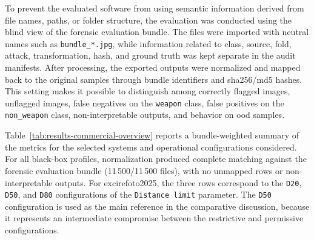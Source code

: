 To prevent the evaluated software from using semantic information derived from
file names, paths, or folder structure, the evaluation was conducted using the
blind view of the forensic evaluation bundle. The files were imported with
neutral names such as \texttt{bundle\_*.jpg}, while information related to
class, source, fold, attack, transformation, hash, and ground truth was kept
separate in the audit manifests. After processing, the exported outputs were
normalized and mapped back to the original samples through bundle identifiers
and \gls{sha256}/\gls{md5} hashes. This setting makes it possible to
distinguish among correctly flagged images, unflagged images, false negatives
on the \texttt{weapon} class, false positives on the \texttt{non\_weapon}
class, non-interpretable outputs, and behavior on \gls{ood} samples.

Table~\ref{tab:results-commercial-overview} reports a bundle-weighted summary
of the metrics for the selected systems and operational configurations
considered. For all black-box profiles, normalization produced complete
matching against the forensic evaluation bundle (11\,500/11\,500 files), with
no unmapped rows or non-interpretable outputs. For \gls{excirefoto2025}, the
three rows correspond to the \texttt{D20}, \texttt{D50}, and \texttt{D80}
configurations of the \texttt{Distance limit} parameter. The \texttt{D50}
configuration is used as the main reference in the comparative discussion,
because it represents an intermediate compromise between the restrictive and
permissive configurations.


